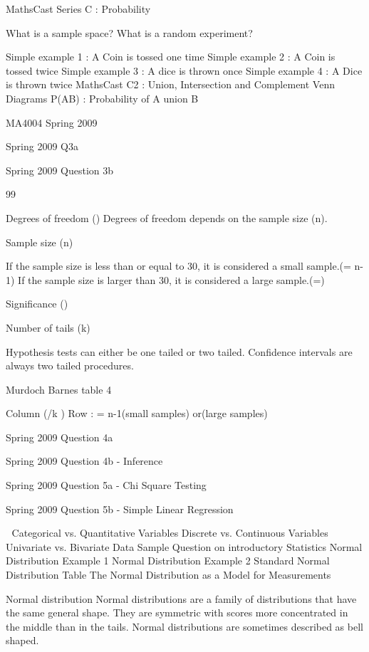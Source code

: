 MathsCast Series C : Probability

What is a sample space?
What is a random experiment?
 
Simple example 1 : A Coin is tossed one time
Simple example 2 : A Coin is tossed twice
Simple example 3 : A dice is thrown once
Simple example 4 : A Dice is thrown twice  
MathsCast C2 : Union, Intersection and Complement
Venn Diagrams
P(AB)  : Probability of A union B


MA4004 Spring 2009

Spring 2009 Q3a


Spring 2009 Question 3b

99%


Degrees of freedom ()
Degrees of freedom depends on the sample size (n).

Sample size (n)

If the sample size is less than or equal to 30, it is considered a small sample.(= n-1)
If the sample size is larger than 30, it is considered a large sample.(=)

Significance ()

Number of tails (k)

Hypothesis tests can either be one tailed or two tailed.
Confidence intervals are always two tailed procedures.


Murdoch Barnes table 4

Column (/k )
Row : = n-1(small samples) or(large samples)


Spring 2009 Question 4a

Spring 2009 Question 4b - Inference



Spring 2009 Question 5a - Chi Square Testing





Spring 2009 Question 5b - Simple Linear Regression



Categorical vs. Quantitative Variables
Discrete vs. Continuous Variables
Univariate vs. Bivariate Data
Sample Question on introductory Statistics
Normal Distribution Example 1
Normal Distribution Example 2
Standard Normal Distribution Table
The Normal Distribution as a Model for Measurements

Normal distribution
Normal distributions are a family of distributions that have the same general shape. They are symmetric with scores more concentrated in the middle than in the tails. Normal distributions are sometimes described as bell shaped. 

